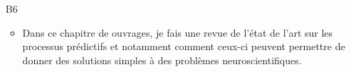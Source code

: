 \begin{enumerate}
%
%
%
%
%
%
%
%
%
%
%
%
%
%
%
%
%

%
%
%
\item[B6] %
\begin{itemize}
  \item Dans ce chapitre de ouvrages, je fais une revue de l'état de l'art sur les processus prédictifs et notamment comment ceux-ci peuvent permettre de donner des solutions simples à des problèmes neuroscientifiques.
\end{itemize}

%
%
%
%


\end{enumerate}
